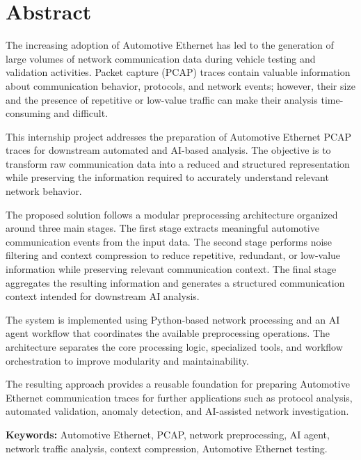 \chapter*{Abstract}

The increasing adoption of Automotive Ethernet has led to the generation of large volumes of network communication data during vehicle testing and validation activities. Packet capture (PCAP) traces contain valuable information about communication behavior, protocols, and network events; however, their size and the presence of repetitive or low-value traffic can make their analysis time-consuming and difficult.

This internship project addresses the preparation of Automotive Ethernet PCAP traces for downstream automated and AI-based analysis. The objective is to transform raw communication data into a reduced and structured representation while preserving the information required to accurately understand relevant network behavior.

The proposed solution follows a modular preprocessing architecture organized around three main stages. The first stage extracts meaningful automotive communication events from the input data. The second stage performs noise filtering and context compression to reduce repetitive, redundant, or low-value information while preserving relevant communication context. The final stage aggregates the resulting information and generates a structured communication context intended for downstream AI analysis.

The system is implemented using Python-based network processing and an AI agent workflow that coordinates the available preprocessing operations. The architecture separates the core processing logic, specialized tools, and workflow orchestration to improve modularity and maintainability.

The resulting approach provides a reusable foundation for preparing Automotive Ethernet communication traces for further applications such as protocol analysis, automated validation, anomaly detection, and AI-assisted network investigation.

\vspace{0.5cm}

\noindent\textbf{Keywords:} Automotive Ethernet, PCAP, network preprocessing, AI agent, network traffic analysis, context compression, Automotive Ethernet testing.